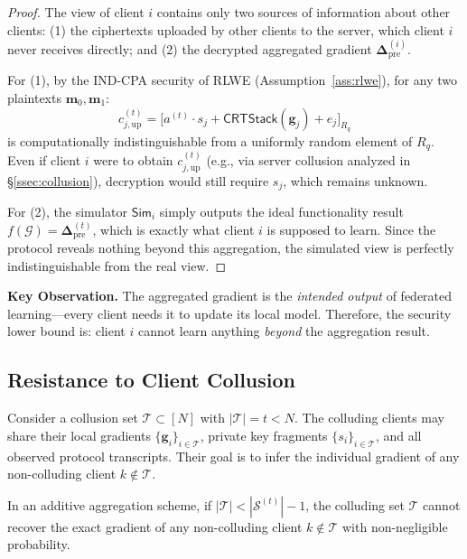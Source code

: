 \begin{proof}
The view of client $i$ contains only two sources of information about other clients: (1) the ciphertexts uploaded by other clients to the server, which client $i$ never receives directly; and (2) the decrypted aggregated gradient $\mathbf{\Delta}_{\text{pre}}^{(i)}$.

For (1), by the IND-CPA security of RLWE (Assumption~\ref{ass:rlwe}), for any two plaintexts $\mathbf{m}_0, \mathbf{m}_1$:
\begin{equation}
    c_{j,\mathrm{up}}^{(t)} = \bigl[ a^{(t)} \cdot s_j + \mathsf{CRTStack}(\mathbf{g}_j) + e_j \bigr]_{R_q}
\end{equation}
is computationally indistinguishable from a uniformly random element of $R_q$. Even if client $i$ were to obtain $c_{j,\mathrm{up}}^{(t)}$ (e.g., via server collusion analyzed in \S\ref{ssec:collusion}), decryption would still require $s_j$, which remains unknown.

For (2), the simulator $\mathsf{Sim}_i$ simply outputs the ideal functionality result $f(\mathcal{G}) = \mathbf{\Delta}_{\text{pre}}^{(t)}$, which is exactly what client $i$ is supposed to learn. Since the protocol reveals nothing beyond this aggregation, the simulated view is perfectly indistinguishable from the real view.
\end{proof}

\noindent\textbf{Key Observation.} The aggregated gradient is the \emph{intended output} of federated learning---every client needs it to update its local model. Therefore, the security lower bound is: client $i$ cannot learn anything \emph{beyond} the aggregation result.

\subsection{Resistance to Client Collusion}
\label{ssec:client-collusion}

Consider a collusion set $\mathcal{T} \subset [N]$ with $|\mathcal{T}| = t < N$. The colluding clients may share their local gradients $\{\mathbf{g}_i\}_{i \in \mathcal{T}}$, private key fragments $\{s_i\}_{i \in \mathcal{T}}$, and all observed protocol transcripts. Their goal is to infer the individual gradient of any non-colluding client $k \notin \mathcal{T}$.

\begin{theorem}
\label{thm:collusion}
In an additive aggregation scheme, if $|\mathcal{T}| < |\mathcal{S}^{(t)}| - 1$, the colluding set $\mathcal{T}$ cannot recover the exact gradient of any non-colluding client $k \notin \mathcal{T}$ with non-negligible probability.
\end{theorem}

